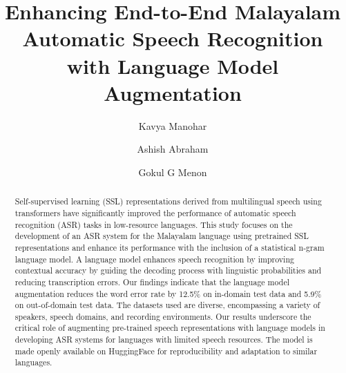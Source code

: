 \documentclass[runningheads]{llncs}
\begin{document}
%
\title{Enhancing End-to-End Malayalam Automatic Speech Recognition with Language Model Augmentation}

%
\author{Kavya Manohar \and
Ashish Abraham \and
Gokul G Menon}
%
%

\maketitle              %
%
\begin{abstract}

Self-supervised learning (SSL) representations derived from multilingual speech using transformers have significantly improved the performance of automatic speech recognition (ASR) tasks in low-resource languages. This study focuses on the development of an ASR system for the Malayalam language using pretrained SSL representations and enhance its performance with the inclusion of a statistical n-gram language model. A language model enhances speech recognition by improving contextual accuracy by guiding the decoding process with linguistic probabilities and reducing transcription errors. Our findings indicate that the language model augmentation reduces the word error rate by 12.5\% on in-domain test data and 5.9\% on out-of-domain test data. The datasets used are diverse, encompassing a variety of speakers, speech domains, and recording environments.  Our results underscore the critical role of augmenting pre-trained speech representations with language models in developing ASR systems for languages with limited speech resources. The model is made openly available on HuggingFace for reproducibility and adaptation to similar languages.

\end{abstract}
\end{document}
